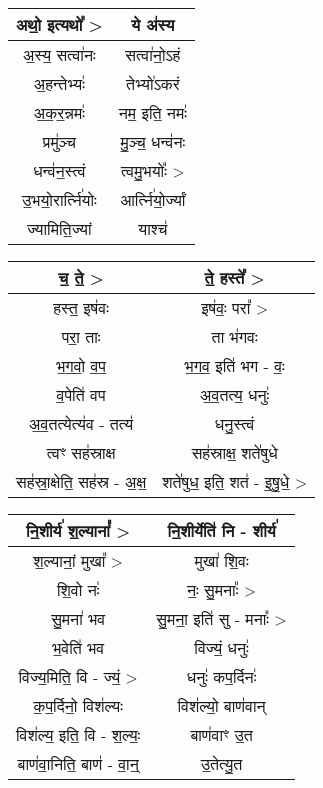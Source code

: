 {\centering
\begin{longtable}{|c|c|}
\hline
अथो॒ इत्यथो᳚ >              & ये अ॑स्य\\
\hline
अ॒स्य॒ सत्वा॑नः               & सत्वा॑नो॒ऽहं\\
\hline
अ॒हन्तेभ्यः॑                  & तेभ्यो॑ऽकरं\\
\hline
अ॒क॒र॒न्नमः॑                  & नम॒ इति॒ नमः॑\\
\hline
प्रमु॑ञ्च                    & मु॒ञ्च॒ धन्व॑नः\\
\hline
धन्व॑न॒स्त्वं                  & त्वमु॒भयोः᳚ >\\
\hline
उ॒भयो॒रार्त्नि॑योः            & आर्त्नि॑यो॒र्ज्यां\\
\hline
ज्यामिति॒ज्यां               & याश्च॑\\
\hline
\end{longtable}
}
{\centering
\begin{longtable}{|c|c|}
\hline
च॒ ते॒ >                    & ते॒ हस्ते᳚ >\\
\hline
हस्त॒ इष॑वः                 & इष॑वः॒ परा᳚ >\\
\hline
परा॒ ताः                  & ता भ॑गवः\\
\hline
भ॒ग॒वो॒ व॒प॒                  & भ॒ग॒व॒ इति॑ भग - वः॒\\
\hline
व॒पेति॑ वप                  & अ॒व॒तत्य॒ धनुः॑\\
\hline
अ॒व॒तत्येत्य॑व - तत्य॑           & धनु॒स्त्वं\\
\hline
त्वꣳ सह॑स्राक्ष              & सह॑स्राक्ष॒ शते॑षुधे\\
\hline
सह॑स्रा॒क्षेति॒ सह॑स्र - अ॒क्ष॒     & शते॑षुध॒ इति॒ शत॑ - इ॒षु॒धे॒ >\\
\hline
\end{longtable}
}
{\centering
\begin{longtable}{|c|c|}
\hline
नि॒शीर्य॑ श॒ल्यानां᳚ >          & नि॒शीर्येति॑ नि - शीर्य॑\\
\hline
श॒ल्यानां॒ मुखा᳚ >             & मुखा॑ शि॒वः\\
\hline
शि॒वो नः॑                  & नः॒ सु॒मनाः᳚ >\\
\hline
सु॒मना॑ भव                  & सु॒मना॒ इति॑ सु - मनाः᳚ >\\
\hline
भ॒वेति॑ भव                  & विज्यं॒ धनुः॑\\
\hline
विज्य॒मिति॒ वि - ज्यं॒ >       & धनुः॑ कप॒र्दिनः॑\\
\hline
क॒प॒र्दिनो॒ विश॑ल्यः           & विश॑ल्यो॒ बाण॑वान्\\
\hline
विश॑ल्य॒ इति॒ वि - श॒ल्यः॒      & बाण॑वाꣳ उ॒त\\
\hline
बाण॑वा॒निति॒ बाण॑ - वा॒न्॒      & उ॒तेत्यु॒त\\
\hline
\end{longtable}
}
